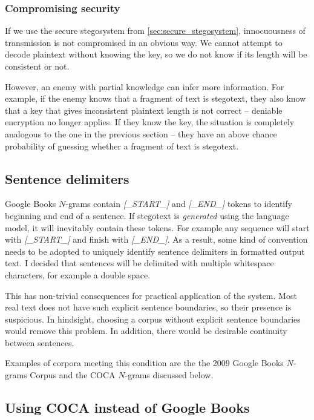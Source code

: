 \documentclass[draft]{IIBproject}
\DeclareRobustCommand{\ngram}[1]{\emph{[#1]}}
\begin{document}
\subsubsection{Compromising security}

If we use the secure stegosystem from \cref{sec:secure_stegosystem}, innocuousness of transmission is not compromised in an obvious way. We cannot attempt to decode plaintext without knowing the key, so we do not know if its length will be consistent or not.

However, an enemy with partial knowledge can infer more information. For example, if the enemy knows that a fragment of text is stegotext, they also know that a key that gives inconsistent plaintext length is not correct -- deniable encryption no longer applies. If they know the key, the situation is completely analogous to the one in the previous section -- they have an above chance probability of guessing whether a fragment of text is stegotext.

\subsection{Sentence delimiters}

Google Books $N$-grams contain \ngram{\_START\_} and \ngram{\_END\_} tokens to identify beginning and end of a sentence. If stegotext is \emph{generated} using the language model, it will inevitably contain these tokens. For example any sequence will start with \ngram{\_START\_} and finish with \ngram{\_END\_}. As a result, some kind of convention needs to be adopted to uniquely identify sentence delimiters in formatted output text. I decided that sentences will be delimited with multiple whitespace characters, for example a double space.

This has non-trivial consequences for practical application of the system. Most real text does not have such explicit sentence boundaries, so their presence is suspicious. In hindsight, choosing a corpus without explicit sentence boundaries would remove this problem. In addition, there would be desirable continuity between sentences.

Examples of corpora meeting this condition are the the 2009 Google Books $N$-grams Corpus and the COCA $N$-grams discussed below.

\subsection{Using COCA instead of Google Books}
\end{document}
